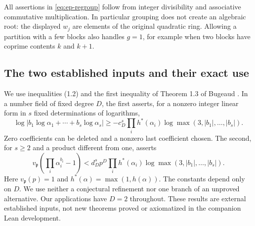 All assertions in \eqref{eq:ep-regroup} follow from integer divisibility and
associative commutative multiplication. In particular grouping does not create
an algebraic root: the displayed $w_j$ are elements of the original quadratic
ring. Allowing a partition with a few blocks also handles $g=1$, for example
when two blocks have coprime contents $k$ and $k+1$.

\subsection{The two established inputs and their exact use}
We use inequalities (1.2) and the first inequality of Theorem 1.3 of
Bugeaud \cite{EPBugeaud2022}. In a number field of fixed degree $D$, the first
asserts, for a nonzero integer linear form in $s$ fixed determinations of
logarithms,
\[
 \log|b_1\log\alpha_1+\cdots+b_s\log\alpha_s|
 \ge -c_D^s\prod_i h^*(\alpha_i)\log\max(3,|b_1|,\ldots,|b_s|).
\]
Zero coefficients can be deleted and a nonzero last coefficient chosen. The
second, for $s\ge2$ and a product different from one, asserts
\[
 v_{\mathfrak p}\left(\prod_i\alpha_i^{b_i}-1\right)
 <d_D^s p^D\prod_i h^*(\alpha_i)\log\max(3,|b_1|,\ldots,|b_s|).
\]
Here $v_{\mathfrak p}(p)=1$ and $h^*(\alpha)=\max(1,h(\alpha))$.
The constants depend only on $D$. We use neither a conjectural refinement nor
one branch of an unproved alternative. Our applications have $D=2$ throughout.
These results are external established inputs, not new theorems proved or
axiomatized in the companion Lean development.

